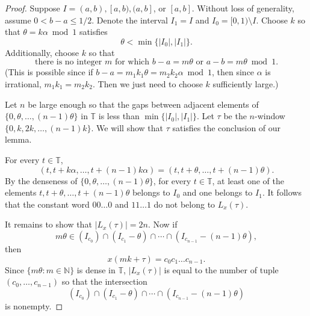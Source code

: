 \documentclass[11pt,reqno]{amsart}
\theoremstyle{definition}
\theoremstyle{plain}
\newcommand{\N}{\mathbb{N}}
\newcommand{\T}{\mathbb{T}}
\newcommand{\AuthornoteA}[2]{{\sf\small\color{magenta}{[#1: #2]}}}
\newcommand{\AuthornoteR}[2]{{\sf\small\color{blue}{[#1: #2]}}}
\newcommand{\Anote}{\AuthornoteA{A}}
\newcommand{\rp}{\AuthornoteR{R}}
\begin{document}
\begin{proof}


Suppose $I = (a, b), [a, b), (a, b]$, or $[a, b]$. Without loss of generality, assume $0 < b - a \leq 1/2$. Denote the interval $I_1 = I$ and $I_0 = [0, 1) \setminus I$. Choose $k$ so that $\theta = k \alpha \bmod 1$ satisfies 
\begin{equation}\label{eq:theta_min}
    \theta < \min \{|I_0|, |I_1|\}.
\end{equation} 
Additionally, choose $k$ so that 
\begin{equation}\label{eq:no_integer}
    \text{there is no integer $m$ for which $b - a = m\theta$ or $a - b = m \theta \bmod 1$.}
\end{equation} 
(This is possible since if $b - a = m_1 k_1 \theta = m_2 k_2 \alpha \bmod 1$, then since $\alpha$ is irrational, $m_1 k_1 = m_2 k_2$. Then we just need to choose $k$ sufficiently large.)

Let $n$ be large enough so that the gaps between adjacent elements of $\{0, \theta, \ldots, (n-1) \theta\}$ in $\T$ is less than $\min\{|I_0|, |I_1|\}$. Let $\tau$ be the $n$-window $\{0, k, 2k, \ldots, (n-1) k\}$. We will show that $\tau$ satisfies the conclusion of our lemma. 

For every $t \in \T$, 
\[
    (t, t + k \alpha, \ldots, t + (n-1)k \alpha) = (t, t + \theta, \ldots, t + (n-1) \theta). 
\]
By the denseness of $\{0, \theta, \ldots, (n-1) \theta\}$, for every $t \in \T$, at least one of the elements $t, t + \theta, \ldots, t + (n-1) \theta$ belongs to $I_0$ and one belongs to $I_1$. It follows that the constant word $00\ldots0$ and $11 \ldots 1$ do not belong to $L_{x}(\tau)$.

It remains to show that $|L_x(\tau)| = 2n$.
Now if 
\[
    m \theta \in (I_{c_0}) \cap (I_{c_1} - \theta) \cap \cdots \cap (I_{c_{n-1}} - (n-1) \theta),
\]
then 
\[
    x(mk + \tau) = c_0 c_1 \ldots c_{n-1}.
\]
Since $\{m\theta: m \in \N\}$ is dense in $\T$, $|L_x(\tau)|$ is equal to the number of tuple $(c_0, \ldots, c_{n-1})$ so that the intersection 
\begin{equation}\label{eq:intersection}
     (I_{c_0}) \cap (I_{c_1} - \theta) \cap \cdots \cap (I_{c_{n-1}} - (n-1) \theta)
\end{equation}
is nonempty.


\end{proof}
\end{document}
